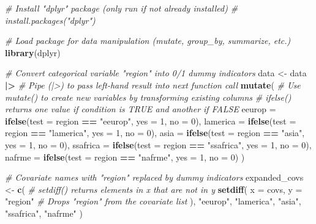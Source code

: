 \documentclass[
  12pt,
  leqno]{article}
\newenvironment{Shaded}{\begin{snugshade}}{\end{snugshade}}
\newcommand{\AttributeTok}[1]{\textcolor[rgb]{0.13,0.29,0.53}{#1}}
\newcommand{\CommentTok}[1]{\textcolor[rgb]{0.56,0.35,0.01}{\textit{#1}}}
\newcommand{\DecValTok}[1]{\textcolor[rgb]{0.00,0.00,0.81}{#1}}
\newcommand{\FunctionTok}[1]{\textcolor[rgb]{0.13,0.29,0.53}{\textbf{#1}}}
\newcommand{\NormalTok}[1]{#1}
\newcommand{\OtherTok}[1]{\textcolor[rgb]{0.56,0.35,0.01}{#1}}
\newcommand{\SpecialCharTok}[1]{\textcolor[rgb]{0.81,0.36,0.00}{\textbf{#1}}}
\newcommand{\StringTok}[1]{\textcolor[rgb]{0.31,0.60,0.02}{#1}}
\begin{document}
\begin{Shaded}
\begin{Highlighting}[]
\CommentTok{\# Install "dplyr" package (only run if not already installed)}
\CommentTok{\# install.packages("dplyr")}

\CommentTok{\# Load package for data manipulation (mutate, group\_by, summarize, etc.)}
\FunctionTok{library}\NormalTok{(dplyr)}

\CommentTok{\# Convert categorical variable "region" into 0/1 dummy indicators}
\NormalTok{data }\OtherTok{\textless{}{-}}\NormalTok{ data }\SpecialCharTok{|\textgreater{}} \CommentTok{\# Pipe (|\textgreater{}) to pass left{-}hand result into next function call}
  \FunctionTok{mutate}\NormalTok{(}
    \CommentTok{\# Use mutate() to create new variables by transforming existing columns}
    \CommentTok{\# ifelse() returns one value if condition is TRUE and another if FALSE}
    \AttributeTok{eeurop   =} \FunctionTok{ifelse}\NormalTok{(}\AttributeTok{test =}\NormalTok{ region }\SpecialCharTok{==} \StringTok{"eeurop"}\NormalTok{,   }\AttributeTok{yes =} \DecValTok{1}\NormalTok{, }\AttributeTok{no =} \DecValTok{0}\NormalTok{),}
    \AttributeTok{lamerica =} \FunctionTok{ifelse}\NormalTok{(}\AttributeTok{test =}\NormalTok{ region }\SpecialCharTok{==} \StringTok{"lamerica"}\NormalTok{, }\AttributeTok{yes =} \DecValTok{1}\NormalTok{, }\AttributeTok{no =} \DecValTok{0}\NormalTok{),}
    \AttributeTok{asia     =} \FunctionTok{ifelse}\NormalTok{(}\AttributeTok{test =}\NormalTok{ region }\SpecialCharTok{==} \StringTok{"asia"}\NormalTok{,     }\AttributeTok{yes =} \DecValTok{1}\NormalTok{, }\AttributeTok{no =} \DecValTok{0}\NormalTok{),}
    \AttributeTok{ssafrica =} \FunctionTok{ifelse}\NormalTok{(}\AttributeTok{test =}\NormalTok{ region }\SpecialCharTok{==} \StringTok{"ssafrica"}\NormalTok{, }\AttributeTok{yes =} \DecValTok{1}\NormalTok{, }\AttributeTok{no =} \DecValTok{0}\NormalTok{),}
    \AttributeTok{nafrme   =} \FunctionTok{ifelse}\NormalTok{(}\AttributeTok{test =}\NormalTok{ region }\SpecialCharTok{==} \StringTok{"nafrme"}\NormalTok{,   }\AttributeTok{yes =} \DecValTok{1}\NormalTok{, }\AttributeTok{no =} \DecValTok{0}\NormalTok{)}
\NormalTok{  )}

\CommentTok{\# Covariate names with "region" replaced by dummy indicators}
\NormalTok{expanded\_covs }\OtherTok{\textless{}{-}} \FunctionTok{c}\NormalTok{(}
  \CommentTok{\# setdiff() returns elements in \textquotesingle{}x\textquotesingle{} that are not in \textquotesingle{}y\textquotesingle{}}
  \FunctionTok{setdiff}\NormalTok{(}
    \AttributeTok{x =}\NormalTok{ covs,}
    \AttributeTok{y =} \StringTok{"region"} \CommentTok{\# Drops "region" from the covariate list}
\NormalTok{  ),}
  \StringTok{"eeurop"}\NormalTok{, }\StringTok{"lamerica"}\NormalTok{, }\StringTok{"asia"}\NormalTok{, }\StringTok{"ssafrica"}\NormalTok{, }\StringTok{"nafrme"}
\NormalTok{)}
\end{Highlighting}
\end{Shaded}
\end{document}
